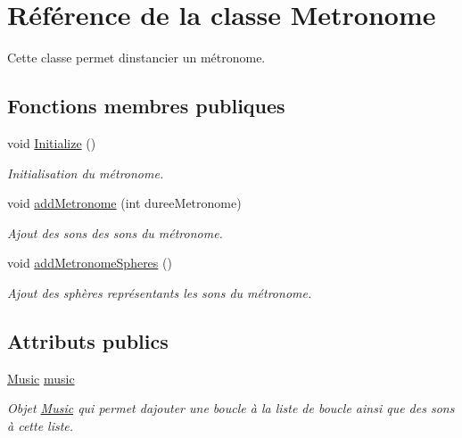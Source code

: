 \hypertarget{class_metronome}{}\section{Référence de la classe Metronome}
\label{class_metronome}


Cette classe permet d\textquotesingle{}instancier un métronome.  


\subsection*{Fonctions membres publiques}
\begin{DoxyCompactItemize}
\item 
void \hyperlink{class_metronome_a0189b04ace6a9f1b5bdb74cb8e3b20bc}{Initialize} ()
\begin{DoxyCompactList}\small\item\em Initialisation du métronome. \end{DoxyCompactList}\item 
void \hyperlink{class_metronome_a1bc290b5b41c27ab776b57214853e05b}{add\+Metronome} (int duree\+Metronome)
\begin{DoxyCompactList}\small\item\em Ajout des sons des sons du métronome. \end{DoxyCompactList}\item 
void \hyperlink{class_metronome_a51f41efee7a5e051c3a4c726f28149eb}{add\+Metronome\+Spheres} ()
\begin{DoxyCompactList}\small\item\em Ajout des sphères représentants les sons du métronome. \end{DoxyCompactList}\end{DoxyCompactItemize}
\subsection*{Attributs publics}
\begin{DoxyCompactItemize}
\item 
\hyperlink{class_music}{Music} \hyperlink{class_metronome_a9434e9e563d5b903c4a800d7529a0c9a}{music}
\begin{DoxyCompactList}\small\item\em Objet \hyperlink{class_music}{Music} qui permet d\textquotesingle{}ajouter une boucle à la liste de boucle ainsi que des sons à cette liste. \end{DoxyCompactList}\end{DoxyCompactItemize}
